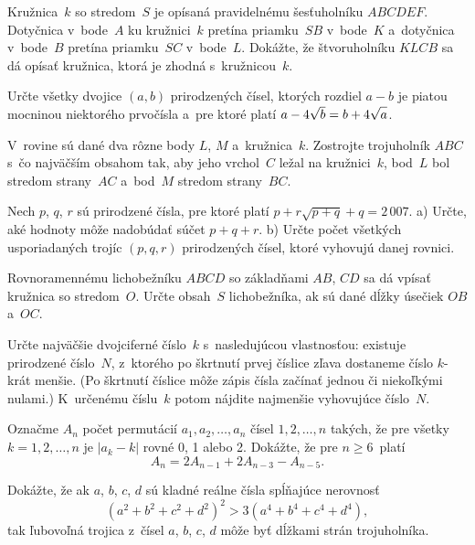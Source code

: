 {%
Kružnica~$k$ so stredom~$S$ je opísaná pravidelnému šesťuholníku $ABCDEF$. Dotyčnica v~bode~$A$ ku kružnici~$k$ pretína priamku~$SB$ v~bode~$K$ a~dotyčnica v~bode~$B$ pretína priamku~$SC$ v~bode~$L$. Dokážte, že štvoruholníku $KLCB$ sa dá opísať kružnica, ktorá je zhodná s~kružnicou~$k$.}

{%
Určte všetky dvojice $(a,b)$ prirodzených čísel, ktorých rozdiel $a-b$ je piatou mocninou niektorého prvočísla a~pre ktoré platí $a-4\sqrt b=b+4\sqrt{a\vphantom b}$.}

{%
V~rovine sú dané dva rôzne body $L$, $M$ a~kružnica~$k$. Zostrojte
trojuholník $ABC$ s~čo najväčším obsahom tak, aby jeho vrchol~$C$
ležal na kružnici~$k$, bod~$L$ bol stredom strany~$AC$ a~bod~$M$
stredom strany~$BC$.}

{%
Nech $p$, $q$, $r$ sú prirodzené čísla, pre ktoré platí
$p+r\sqrt{p+q}+q=2\,007$.
\ite a) Určte, aké hodnoty môže nadobúdať súčet $p+q+r$.
\ite b) Určte počet všetkých usporiadaných trojíc $(p,q,r)$ prirodzených čísel,
        ktoré vyhovujú danej rovnici.

        }

{%
Rovnoramennému lichobežníku $ABCD$ so základňami $AB$, $CD$ sa dá
vpísať kružnica so stredom~$O$. Určte obsah~$S$ lichobežníka,
ak sú dané dĺžky úsečiek $OB$ a~$OC$.}

{%
Určte najväčšie dvojciferné číslo~$k$ s~nasledujúcou vlastnosťou:
existuje prirodzené číslo~$N$, z~ktorého po škrtnutí prvej číslice
zľava dostaneme číslo $k$-krát menšie. (Po škrtnutí číslice môže
zápis čísla začínať jednou či niekoľkými nulami.) K~určenému
číslu~$k$ potom nájdite najmenšie vyhovujúce číslo~$N$.}

{%
Označme $A_n$ počet permutácií $a_1, a_2,\dots, a_n$ čísel $1,2,\dots,n$ takých, že
pre všetky $k=1,2,\dots,n$ je $|a_k-k|$ rovné 0, 1 alebo 2. Dokážte, že
pre $n\ge 6$~platí
$$
A_n=2A_{n-1}+2A_{n-3}-A_{n-5}.
$$}

{%
Dokážte, že ak $a$, $b$, $c$, $d$ sú kladné reálne čísla spĺňajúce nerovnosť
$$
\left(a^2+b^2+c^2+d^2\right)^2 > 3\left(a^4+b^4+c^4+d^4\right),
$$
tak ľubovoľná trojica z~čísel $a$, $b$, $c$, $d$ môže byť
dĺžkami strán trojuholníka.}

